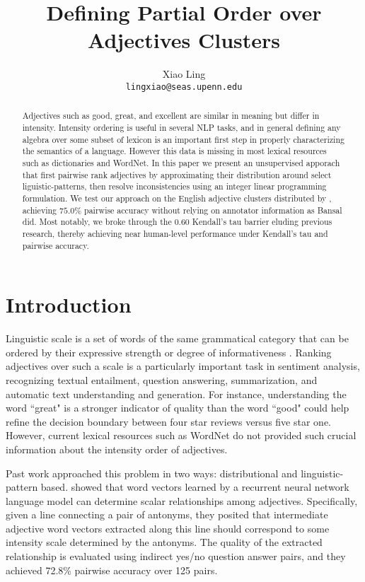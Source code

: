 \documentclass[11pt,letterpaper]{article}
\title{Defining Partial Order over Adjectives Clusters}
\author{Xiao Ling\\
  {\tt lingxiao@seas.upenn.edu}}
\date{}
\begin{document}
\maketitle

\begin{abstract}
Adjectives such as good, great, and excellent are similar in meaning but differ in intensity. Intensity ordering is useful in several NLP tasks, and in general defining any algebra over some subset of lexicon is an important first step in properly characterizing the semantics of a language. However this data is missing in most lexical resources such as dictionaries and WordNet. In this paper we present an unsupervised apporach that first pairwise rank adjectives by approximating their distribution around select liguistic-patterns, then resolve inconsistencies using an integer linear programming formulation. We test our approach on the English adjective clusters distributed by , achieving $75.0\%$ pairwise accuracy without relying on annotator information as Bansal did. Most notably, we broke through the $0.60$ Kendall's tau barrier eluding previous research, thereby achieving near human-level performance under Kendall's tau and pairwise accuracy.
\end{abstract}

\section{Introduction}

Linguistic scale is a set of words of the same grammatical category that can be ordered by their expressive strength or degree of informativeness \cite{sheinman2009adjscales}. Ranking adjectives over such a scale is a particularly important task in sentiment analysis, recognizing textual entailment, question answering, summarization, and automatic text understanding and generation. For instance, understanding the word ``great" is a stronger indicator of quality than the word ``good" could help refine the decision boundary between four star reviews versus five star one. However, current lexical resources such as WordNet do not provided such crucial information about the intensity order of adjectives.

Past work approached this problem in two ways: distributional and linguistic-pattern based.  showed that word vectors learned by a recurrent neural network language model can determine scalar relationships among adjectives. Specifically, given a line connecting a pair of antonyms, they posited that intermediate adjective word vectors extracted along this line should correspond to some intensity scale determined by the antonyms. The quality of the extracted relationship is evaluated using indirect yes/no question answer pairs, and they achieved 72.8\% pairwise accuracy over 125 pairs.
\end{document}
